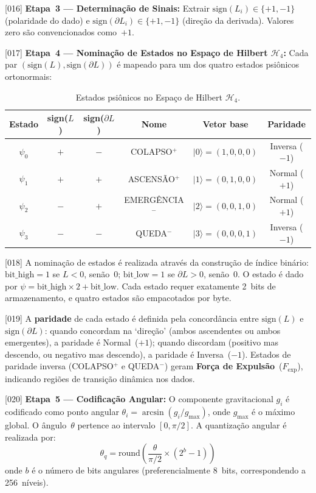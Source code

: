\documentclass[12pt,a4paper]{article}
\newcommand{\Fexp}{F_{\text{exp}}}
\newcommand{\Hfour}{\mathcal{H}_4}
\begin{document}
{[016]} \textbf{Etapa~3 --- Determinação de Sinais:} Extrair
$\text{sign}(L_i) \in \{+1, -1\}$ (polaridade do dado) e
$\text{sign}(\partial L_i) \in \{+1, -1\}$ (direção da
derivada). Valores zero são convencionados como~$+1$.

{[017]} \textbf{Etapa~4 --- Nominação de Estados no Espaço de
Hilbert $\Hfour$:} Cada par $(\text{sign}(L),
\text{sign}(\partial L))$ é mapeado para um dos quatro estados
psiônicos ortonormais:

\begin{table}[H]
\centering
\caption{Estados psiônicos no Espaço de Hilbert $\Hfour$.}
\label{tab:estados}
\begin{tabular}{cccccc}
\toprule
\textbf{Estado} & \textbf{sign($L$)} &
\textbf{sign($\partial L$)} & \textbf{Nome} &
\textbf{Vetor base} & \textbf{Paridade} \\
\midrule
$\psi_0$ & $+$ & $-$ & COLAPSO$^+$ &
$|0\rangle = (1,0,0,0)$ & Inversa ($-1$) \\
$\psi_1$ & $+$ & $+$ & ASCENSÃO$^+$ &
$|1\rangle = (0,1,0,0)$ & Normal ($+1$) \\
$\psi_2$ & $-$ & $+$ & EMERGÊNCIA$^-$ &
$|2\rangle = (0,0,1,0)$ & Normal ($+1$) \\
$\psi_3$ & $-$ & $-$ & QUEDA$^-$ &
$|3\rangle = (0,0,0,1)$ & Inversa ($-1$) \\
\bottomrule
\end{tabular}
\end{table}

{[018]} A nominação de estados é realizada através da construção
de índice binário: $\text{bit\_high} = 1$ se $L < 0$, senão~$0$;
$\text{bit\_low} = 1$ se $\partial L > 0$, senão~$0$. O estado é
dado por $\psi = \text{bit\_high} \times 2 + \text{bit\_low}$.
Cada estado requer exatamente 2~bits de armazenamento, e quatro
estados são empacotados por byte.

{[019]} A \textbf{paridade} de cada estado é definida pela
concordância entre $\text{sign}(L)$ e $\text{sign}(\partial L)$:
quando concordam na `direção' (ambos ascendentes ou ambos
emergentes), a paridade é Normal~($+1$); quando discordam
(positivo mas descendo, ou negativo mas descendo), a paridade é
Inversa~($-1$). Estados de paridade inversa (COLAPSO$^+$ e
QUEDA$^-$) geram \textbf{Força de Expulsão}~($\Fexp$),
indicando regiões de transição dinâmica nos dados.

{[020]} \textbf{Etapa~5 --- Codificação Angular:} O componente
gravitacional $g_i$ é codificado como ponto angular
$\theta_i = \arcsin(g_i / g_{\max})$, onde $g_{\max}$ é o
máximo global. O ângulo~$\theta$ pertence ao intervalo
$[0, \pi/2]$. A quantização angular é realizada por:
\begin{equation}
\theta_q = \text{round}\!\left(\frac{\theta}{\pi/2}
  \times (2^b - 1)\right)
\label{eq:quantiz}
\end{equation}
onde $b$ é o número de bits angulares (preferencialmente 8~bits,
correspondendo a 256~níveis).
\end{document}
